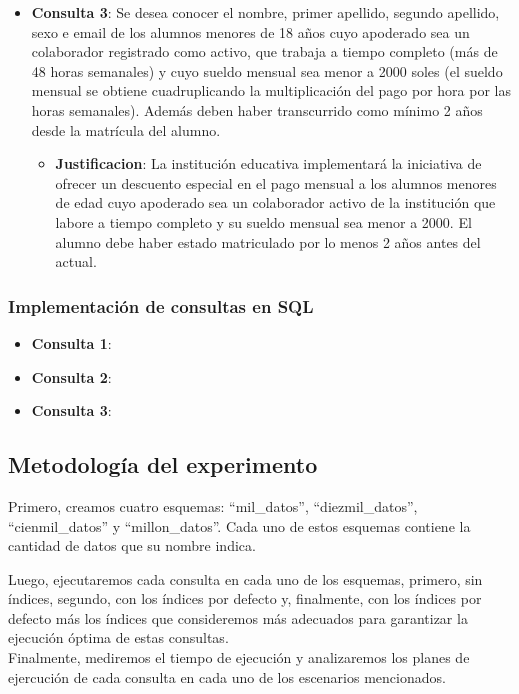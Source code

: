 \begin{itemize}
\begin{itemize}
          \end{itemize}
    \item{\textbf{Consulta 3}: Se desea conocer el nombre, primer apellido, segundo apellido, sexo e email de los alumnos menores de 18 años cuyo apoderado sea un colaborador registrado como activo, que trabaja a tiempo completo (más de 48 horas semanales) y cuyo sueldo mensual sea menor a 2000 soles (el sueldo mensual se obtiene cuadruplicando la multiplicación del pago por hora por las horas semanales). Además deben haber transcurrido como mínimo 2 años desde la matrícula del alumno.}
          \begin{itemize}
              \item{\textbf{Justificacion}: La institución educativa implementará la iniciativa de ofrecer un descuento especial en el pago mensual a los alumnos menores de edad cuyo apoderado sea un colaborador activo de la institución que labore a tiempo completo y su sueldo mensual sea menor a 2000. El alumno debe haber estado matriculado por lo menos 2 años antes del actual.}
          \end{itemize}
\end{itemize}
\subsubsection{Implementación de consultas en SQL}
\begin{itemize}
    \item{\textbf{Consulta 1}:
          }
    \item{\textbf{Consulta 2}:
          }
    \item{\textbf{Consulta 3}:
          }
\end{itemize}
\subsection{Metodología del experimento}
\begin{sloppypar}
    Primero, creamos cuatro esquemas: ``mil\_datos'', ``diezmil\_datos'', ``cienmil\_datos'' y ``millon\_datos''. Cada uno de estos esquemas contiene la cantidad de datos que su nombre indica.
\end{sloppypar}

Luego, ejecutaremos cada consulta en cada uno de los esquemas, primero, sin índices, segundo, con los índices por defecto y, finalmente, con los índices por defecto más los índices que consideremos más adecuados para garantizar la ejecución óptima de estas consultas.\\
Finalmente, mediremos el tiempo de ejecución y analizaremos los planes de ejercución de cada consulta en cada uno de los escenarios mencionados.
